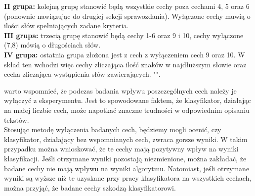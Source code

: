 \documentclass{article}
\begin{document}
\noindent \textbf{II grupa: } kolejną grupę stanowić będą wszystkie cechy poza cechami 4, 5 oraz 6 (ponownie nawiązując do drugiej sekcji sprawozdania). Wyłączone cechy muwią o ilości słów spełniających zadane kryteria. \\

\noindent \textbf{III grupa: } trzecią grupę stanowić będą cechy 1-6 oraz 9 i 10, cechy wyłączone (7,8) mówią o długościach słów. \\

\noindent \textbf{IV grupa: } ostatnia grupa złożona jest z cech z wyłączeniem cech 9 oraz 10. W skład ten wchodzi więc cechy zliczająca ilość znaków w najdłuższym słowie oraz cecha zliczająca wystąpienia słów zawierających. "\textendash".

warto wspomnieć, że podczas badania wpływu poszczególnych cech należy je wyłączyć z eksperymentu. Jest to spowodowane faktem, że klasyfikator, działając na małej liczbie cech, może napotkać znaczne trudności w odpowiednim opisaniu tekstów. \\

\noindent Stosując metodę wyłączenia badanych cech, będziemy mogli ocenić, czy klasyfikator, działający bez wspomnianych cech, zwraca gorsze wyniki. W takim przypadku można wnioskować, że te cechy mają pozytywny wpływ na wyniki klasyfikacji. Jeśli otrzymane wyniki pozostają niezmienione, można zakładać, że badane cechy nie mają wpływu na wyniki algorytmu. Natomiast, jeśli otrzymane wyniki są wyższe niż te uzyskane przy pracy klasyfikatora na wszystkich cechach, można przyjąć, że badane cechy szkodzą klasyfikatorowi.
\end{document}
